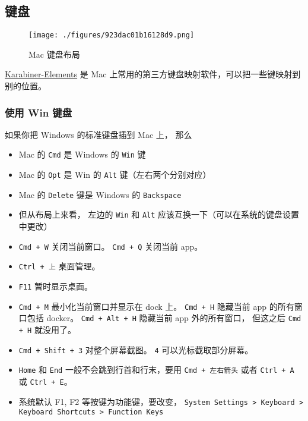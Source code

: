 
\subsection{键盘}
\begin{figure}[ht]
\centering
\texttt{[image: ./figures/923dac01b16128d9.png]}
\caption{Mac 键盘布局} \label{fig_MacNt_1}
\end{figure}

\href{https://karabiner-elements.pqrs.org/}{Karabiner-Elements} 是 Mac 上常用的第三方键盘映射软件，可以把一些键映射到别的位置。



\subsubsection{使用 Win 键盘}
如果你把 Windows 的标准键盘插到 Mac 上， 那么
\begin{itemize}
\item Mac 的 \verb|Cmd| 是 Windows 的 \verb|Win| 键
\item Mac 的 \verb|Opt| 是 Win 的 \verb|Alt| 键（左右两个分别对应）
\item Mac 的 \verb|Delete| 键是 Windows 的 \verb|Backspace|
\item 但从布局上来看， 左边的 \verb|Win| 和 \verb|Alt| 应该互换一下（可以在系统的键盘设置中更改）
\item \verb|Cmd + W| 关闭当前窗口。 \verb|Cmd + Q| 关闭当前 app。
\item \verb|Ctrl + 上| 桌面管理。
\item \verb|F11| 暂时显示桌面。
\item \verb|Cmd + M| 最小化当前窗口并显示在 dock 上。 \verb`Cmd + H` 隐藏当前 app 的所有窗口包括 docker。 \verb`Cmd + Alt + H` 隐藏当前 app 外的所有窗口， 但这之后 \verb`Cmd + H` 就没用了。
\item \verb|Cmd + Shift + 3| 对整个屏幕截图。 \verb|4| 可以光标截取部分屏幕。
\item \verb|Home| 和 \verb|End| 一般不会跳到行首和行末，要用 \verb|Cmd + 左右箭头| 或者 \verb`Ctrl + A` 或 \verb`Ctrl + E`。
\item 系统默认 F1, F2 等按键为功能键，要改变， \verb`System Settings > Keyboard > Keyboard Shortcuts > Function Keys`
\end{itemize}

